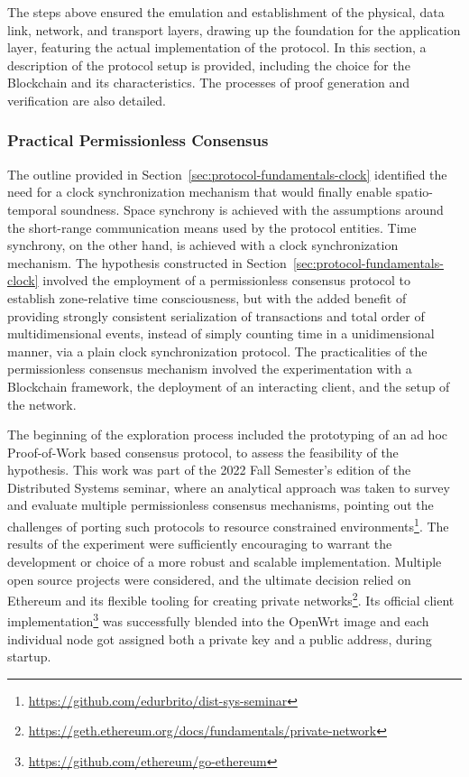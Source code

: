 The steps above ensured the emulation and establishment of the physical, data link, network, and transport layers, drawing up the foundation for the application layer, featuring the actual implementation of the \pol{} protocol. In this section, a description of the protocol setup is provided, including the choice for the Blockchain and its characteristics. The processes of proof generation and verification are also detailed.

\subsubsection{Practical Permissionless Consensus} \label{sec:pol-implementation:practical-permissionless-consensus}

The outline provided in Section~\ref{sec:protocol-fundamentals-clock} identified the need for a clock synchronization mechanism that would finally enable spatio-temporal soundness. Space synchrony is achieved with the assumptions around the short-range communication means used by the protocol entities. Time synchrony, on the other hand, is achieved with a clock synchronization mechanism. The hypothesis constructed in Section~\ref{sec:protocol-fundamentals-clock} involved the employment of a permissionless consensus protocol to establish zone-relative time consciousness, but with the added benefit of providing strongly consistent serialization of transactions and total order of multidimensional events, instead of simply counting time in a unidimensional manner, via a plain clock synchronization protocol. The practicalities of the permissionless consensus mechanism involved the experimentation with a Blockchain framework, the deployment of an interacting client, and the setup of the network.

The beginning of the exploration process included the prototyping of an ad hoc Proof-of-Work based consensus protocol, to assess the feasibility of the hypothesis. This work was part of the 2022 Fall Semester's edition of the Distributed Systems seminar, where an analytical approach was taken to survey and evaluate multiple permissionless consensus mechanisms, pointing out the challenges of porting such protocols to resource constrained environments\footnote{\url{https://github.com/edurbrito/dist-sys-seminar}}. The results of the experiment were sufficiently encouraging to warrant the development or choice of a more robust and scalable implementation. Multiple open source projects were considered, and the ultimate decision relied on Ethereum and its flexible tooling for creating private networks\footnote{\url{https://geth.ethereum.org/docs/fundamentals/private-network}}. Its official client implementation\footnote{\url{https://github.com/ethereum/go-ethereum}} was successfully blended into the OpenWrt image and each individual node got assigned both a private key and a public address, during startup.

